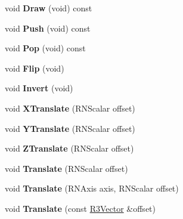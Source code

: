 \begin{DoxyCompactItemize}
\item 
void {\bfseries Draw} (void) const \hypertarget{class_r4_matrix_a6c08b14bd491772146ad766347d5e424}{}\label{class_r4_matrix_a6c08b14bd491772146ad766347d5e424}

\item 
void {\bfseries Push} (void) const \hypertarget{class_r4_matrix_a8b0da9a32b3f00595b538508b52e5a85}{}\label{class_r4_matrix_a8b0da9a32b3f00595b538508b52e5a85}

\item 
void {\bfseries Pop} (void) const \hypertarget{class_r4_matrix_af1c27e040071ca09c359be5d8e2329e1}{}\label{class_r4_matrix_af1c27e040071ca09c359be5d8e2329e1}

\item 
void {\bfseries Flip} (void)\hypertarget{class_r4_matrix_aa7021f48d16a95c3c50cf058cb6cd021}{}\label{class_r4_matrix_aa7021f48d16a95c3c50cf058cb6cd021}

\item 
void {\bfseries Invert} (void)\hypertarget{class_r4_matrix_a8ca50574cc749b08401d133b7a22aeb9}{}\label{class_r4_matrix_a8ca50574cc749b08401d133b7a22aeb9}

\item 
void {\bfseries X\+Translate} (R\+N\+Scalar offset)\hypertarget{class_r4_matrix_a33afb7b74b9ca4246fd6db8df4b48a49}{}\label{class_r4_matrix_a33afb7b74b9ca4246fd6db8df4b48a49}

\item 
void {\bfseries Y\+Translate} (R\+N\+Scalar offset)\hypertarget{class_r4_matrix_aa5531d789194d8fae3d281f3869d132e}{}\label{class_r4_matrix_aa5531d789194d8fae3d281f3869d132e}

\item 
void {\bfseries Z\+Translate} (R\+N\+Scalar offset)\hypertarget{class_r4_matrix_ac4bb45547e652f805828d8e392ec5eff}{}\label{class_r4_matrix_ac4bb45547e652f805828d8e392ec5eff}

\item 
void {\bfseries Translate} (R\+N\+Scalar offset)\hypertarget{class_r4_matrix_aa93726404d7c7a782a377f185b1f8126}{}\label{class_r4_matrix_aa93726404d7c7a782a377f185b1f8126}

\item 
void {\bfseries Translate} (R\+N\+Axis axis, R\+N\+Scalar offset)\hypertarget{class_r4_matrix_a2ab125f041fa5da70c00f76d0a8f81ae}{}\label{class_r4_matrix_a2ab125f041fa5da70c00f76d0a8f81ae}

\item 
void {\bfseries Translate} (const \hyperlink{class_r3_vector}{R3\+Vector} \&offset)\hypertarget{class_r4_matrix_ab473c7c7f42a0e77faeb606f5f1706cf}{}\label{class_r4_matrix_ab473c7c7f42a0e77faeb606f5f1706cf}


\end{DoxyCompactItemize}
